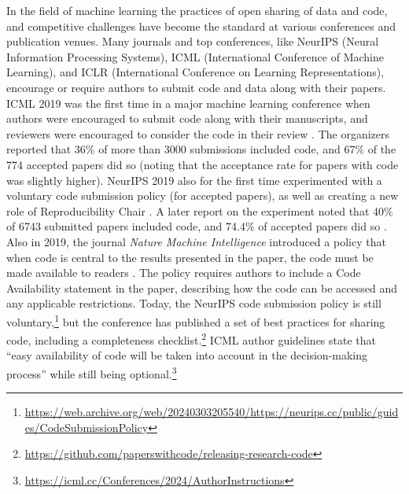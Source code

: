 \documentclass[]{hdsr}
\begin{document}
In the field of machine learning the practices of open sharing of data and code, and competitive challenges have become the standard at various conferences and publication venues.
Many journals and top conferences, like NeurIPS (Neural Information Processing Systems), ICML (International Conference of Machine Learning), and ICLR (International Conference on Learning Representations), encourage or require authors to submit code and data along with their papers. 
ICML 2019 was the first time in a major machine learning conference when authors were encouraged to submit code along with their manuscripts, and reviewers were encouraged to consider the code in their review \citep{chaudhuri2019}.
The organizers reported that  36\% of more than 3000 submissions included code, and 67\% of the 774 accepted papers did so (noting that the acceptance rate for papers with code was slightly higher).
NeurIPS 2019 also for the first time experimented with a voluntary code submission policy (for accepted papers), as well as creating a new role of Reproducibility Chair \citep{pineau2019neurips}. A later report on the experiment noted that 40\% of 6743 submitted papers included code, and 74.4\% of accepted papers did so \citep{pineau2021improving}.
Also in 2019, the journal \emph{Nature Machine Intelligence} introduced a policy that when code is central to the results presented in the paper, the code must be made available to readers \citep{editorial2019naturemi}. The policy requires authors to include a Code Availability statement in the paper, describing how the code can be accessed and any applicable restrictions.
Today, the NeurIPS code submission policy is still voluntary,\footnote{\url{https://web.archive.org/web/20240303205540/https://neurips.cc/public/guides/CodeSubmissionPolicy}} but the conference has published a set of best practices for sharing code, including a completeness checklist.\footnote{\url{https://github.com/paperswithcode/releasing-research-code}}
ICML author guidelines state that ``easy availability of code will be taken into account in the decision-making process'' while still being optional.\footnote{\url{https://icml.cc/Conferences/2024/AuthorInstructions}}
\end{document}
